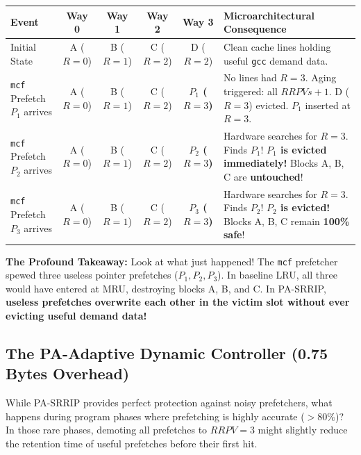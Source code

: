 \documentclass[11pt, a4paper]{article}
\begin{document}
\begin{center}
\small
\begin{tabularx}{\textwidth}{@{}l c c c c >{\raggedright\arraybackslash}X@{}}
\toprule
\textbf{Event} & \textbf{Way 0} & \textbf{Way 1} & \textbf{Way 2} & \textbf{Way 3} & \textbf{Microarchitectural Consequence} \\
\midrule
Initial State & A ($R=0$) & B ($R=1$) & C ($R=2$) & D ($R=2$) & Clean cache lines holding useful \texttt{gcc} demand data. \\
\midrule
\texttt{mcf} Prefetch $P_1$ arrives & A ($R=0$) & B ($R=1$) & C ($R=2$) & \textbf{$P_1$ ($R=3$)} & No lines had $R=3$. Aging triggered: all $RRPVs +1$. D ($R=3$) evicted. $P_1$ inserted at $R=3$. \\
\midrule
\texttt{mcf} Prefetch $P_2$ arrives & A ($R=0$) & B ($R=1$) & C ($R=2$) & \textbf{$P_2$ ($R=3$)} & Hardware searches for $R=3$. Finds $P_1$! \textbf{$P_1$ is evicted immediately!} Blocks A, B, C are \textbf{untouched}! \\
\midrule
\texttt{mcf} Prefetch $P_3$ arrives & A ($R=0$) & B ($R=1$) & C ($R=2$) & \textbf{$P_3$ ($R=3$)} & Hardware searches for $R=3$. Finds $P_2$! \textbf{$P_2$ is evicted!} Blocks A, B, C remain \textbf{100\% safe}! \\
\bottomrule
\end{tabularx}
\end{center}

\noindent\textbf{The Profound Takeaway:} Look at what just happened! The \texttt{mcf} prefetcher spewed three useless pointer prefetches ($P_1, P_2, P_3$). In baseline LRU, all three would have entered at MRU, destroying blocks A, B, and C. In PA-SRRIP, \textbf{useless prefetches overwrite each other in the victim slot without ever evicting useful demand data!}

\subsection{The PA-Adaptive Dynamic Controller (0.75 Bytes Overhead)}
While PA-SRRIP provides perfect protection against noisy prefetchers, what happens during program phases where prefetching is highly accurate ($>80\%$)? In those rare phases, demoting all prefetches to $RRPV=3$ might slightly reduce the retention time of useful prefetches before their first hit.
\end{document}
